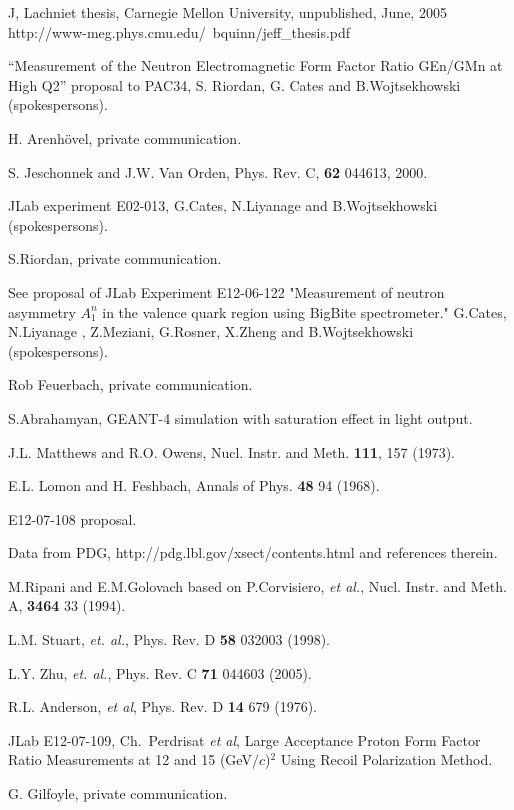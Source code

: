 \documentclass[12pt,letterpaper,oneside]{article}
\begin{document}
\begin{thebibliography}{}
J, Lachniet thesis, Carnegie Mellon University, unpublished, June,
2005\\
http://www-meg.phys.cmu.edu/~bquinn/jeff\_thesis.pdf


``Measurement of the Neutron Electromagnetic Form Factor Ratio GEn/GMn at
High Q2'' proposal to PAC34, S. Riordan, G. Cates and 
B.Wojtsekhowski (spokespersons).



H. Arenh\"ovel, private communication.

S. Jeschonnek and J.W. Van Orden, Phys. Rev. C, {\bf 62} 044613, 2000.

JLab experiment E02-013,
G.Cates, N.Liyanage and B.Wojtsekhowski (spokespersons).


S.Riordan, private communication.

See proposal of JLab Experiment E12-06-122
"Measurement of neutron asymmetry $A_1^n$ in the valence quark
region using BigBite spectrometer."
G.Cates, N.Liyanage , Z.Meziani, G.Rosner, X.Zheng and B.Wojtsekhowski
(spokespersons).


Rob Feuerbach, private communication.

S.Abrahamyan, 
GEANT-4 simulation with saturation effect in light output.

J.L. Matthews and R.O. Owens, Nucl. Instr. and Meth. {\bf 111}, 157 (1973).

E.L. Lomon and H. Feshbach, Annals of Phys. {\bf 48} 94 (1968).

E12-07-108 proposal.

Data from PDG, http://pdg.lbl.gov/xsect/contents.html and references therein.

M.Ripani and E.M.Golovach based on 
P.Corvisiero, {\it et al.}, Nucl. Instr. and Meth. A, {\bf 3464} 33 (1994).


L.M. Stuart, {\it et. al.}, Phys. Rev. D {\bf 58} 032003 (1998).

L.Y. Zhu, {\it et. al.}, Phys. Rev. C {\bf 71} 044603 (2005).


R.L. Anderson, {\it et al}, Phys. Rev. D {\bf 14}  679 (1976).

JLab E12-07-109, 
 Ch.~Perdrisat {\it et al}, Large Acceptance Proton
Form Factor Ratio Measurements at 12 and 15 (GeV/$c$)$^2$
Using Recoil Polarization Method.

G. Gilfoyle, private communication.

\end{thebibliography}
\end{document}
